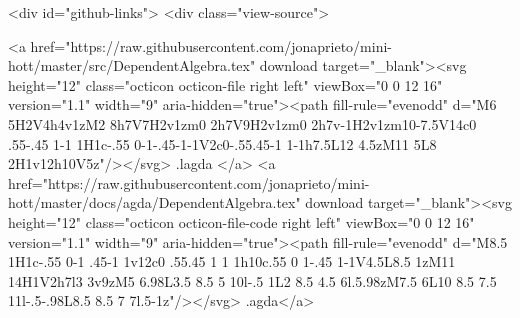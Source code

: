   <div id="github-links">
    <div class="view-source">
      
        <a href="https://raw.githubusercontent.com/jonaprieto/mini-hott/master/src/DependentAlgebra.tex" download target="_blank"><svg height="12" class="octicon octicon-file right left" viewBox="0 0 12 16" version="1.1" width="9" aria-hidden="true"><path fill-rule="evenodd" d="M6 5H2V4h4v1zM2 8h7V7H2v1zm0 2h7V9H2v1zm0 2h7v-1H2v1zm10-7.5V14c0 .55-.45 1-1 1H1c-.55 0-1-.45-1-1V2c0-.55.45-1 1-1h7.5L12 4.5zM11 5L8 2H1v12h10V5z"/></svg> .lagda </a>
        <a href="https://raw.githubusercontent.com/jonaprieto/mini-hott/master/docs/agda/DependentAlgebra.tex" download target="_blank"><svg height="12" class="octicon octicon-file-code right left" viewBox="0 0 12 16" version="1.1" width="9" aria-hidden="true"><path fill-rule="evenodd" d="M8.5 1H1c-.55 0-1 .45-1 1v12c0 .55.45 1 1 1h10c.55 0 1-.45 1-1V4.5L8.5 1zM11 14H1V2h7l3 3v9zM5 6.98L3.5 8.5 5 10l-.5 1L2 8.5 4.5 6l.5.98zM7.5 6L10 8.5 7.5 11l-.5-.98L8.5 8.5 7 7l.5-1z"/></svg> .agda</a>
      
